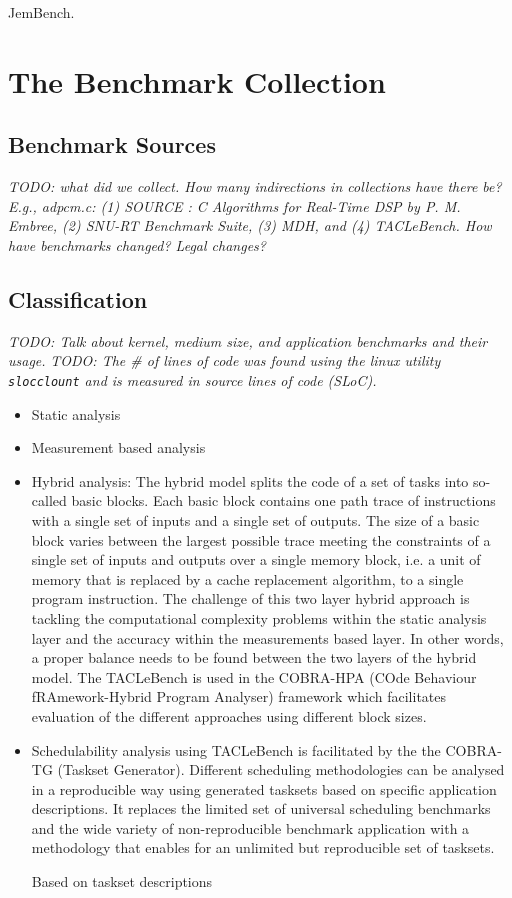 \documentclass[a4paper,UKenglish]{oasics}
\newcommand{\todo}[1]{{\emph{TODO: #1}}}
\newcommand{\code}[1]{{\small{\texttt{#1}}}}
\begin{document}
JemBench.

\section{The Benchmark Collection}
\label{sec:collect}


\subsection{Benchmark Sources}

\todo{what did we collect. How many indirections in collections have there be?
E.g., adpcm.c: (1) SOURCE : C Algorithms for Real-Time DSP by P. M. Embree,
(2) SNU-RT Benchmark Suite, (3) MDH, and (4) TACLeBench. How have
benchmarks  changed? Legal changes?}

\subsection{Classification}

\todo{Talk about kernel, medium size, and application benchmarks and their usage.}
\todo{The \# of lines of code was found using the linux utility \code{slocclount} and is measured in source lines of code (SLoC).}
\begin{itemize}
\item Static analysis
\item Measurement based analysis
\item Hybrid analysis: The hybrid model splits the code of a set of tasks into so-
called basic blocks. Each basic block contains one path trace of instructions with a single set of inputs and a single set of outputs.  The  size  of  a  basic  block  varies  between  the  largest possible trace meeting the constraints of a single set of inputs and outputs over a single memory block, i.e. a unit of memory that is replaced by a cache replacement algorithm, to a single program instruction.
The  challenge  of  this  two  layer  hybrid  approach  is  tackling the computational complexity problems within the static analysis  layer  and  the  accuracy  within  the  measurements based  layer.  In  other  words,  a  proper  balance  needs  to  be found between the two layers of the hybrid model. The TACLeBench is used in the COBRA-HPA (COde Behaviour fRAmework-Hybrid Program Analyser) framework which facilitates evaluation of the different approaches using different block sizes.
\item Schedulability analysis using TACLeBench is facilitated by the the COBRA-TG (Taskset Generator). Different scheduling methodologies can be analysed in a reproducible way using generated tasksets based on specific application descriptions. It replaces the limited set of universal scheduling benchmarks and the wide variety of non-reproducible benchmark application with a methodology that enables for an unlimited but reproducible set of tasksets.

Based on taskset descriptions
\end{itemize}
\end{document}
